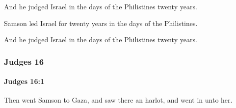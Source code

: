 			\begin{versebox}
					\item[BHS] 
					\item[ASV] And he judged Israel in the days of the Philistines twenty years.
					\item[NIV] Samson led Israel for twenty years in the days of the Philistines.
					\item[NRSV] And he judged Israel in the days of the Philistines twenty years.
			\end{versebox}
	\subsubsection{Judges 16} %
		\label{JUDGES-16}

		\paragraph{Judges 16:1} %
			\label{JUDGES-16-1}

			Then went Samson to Gaza, and saw there an harlot, and went in unto her.


